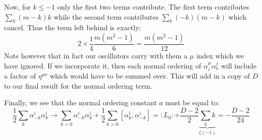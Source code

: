 \documentclass[11pt, class=article, crop=false]{standalone}
\begin{document}
\begin{enumerate}
	 Now, for $k \leq -1$ only the first two terms contribute. The first term contributes $\sum_k (m-k) k$ while the second term contributes $\sum_k (-k) (m-k)$ which cancel. Thus the term left behind is exactly:
	 \begin{equation}
	 	2 \times \frac14 \frac{m(m^2 - 1)}{6} = \frac{m(m^2 - 1)}{12}
	 \end{equation}
	 Note however that in fact our oscillators carry with them a $\mu$ index which we have ignored. If we incorporate it, then each normal ordering of $\alpha_i^\mu \alpha^j_\nu$ will include a factor of $\eta^{\mu \nu}$ which would have to be summed over. This will add in a copy of $D$ to our final result for the normal ordering term.
	 
	 Finally, we see that the normal ordering constant $a$ must be equal to:
	 \begin{equation}
	 	\frac12 \sum_{k} \alpha_{-k}^i \alpha^i_k \to \sum_{k=0} \alpha_{-k}^i \alpha^i_{k} + \frac12 \sum_{k>0} [\alpha^i_{k}, \alpha^i_{-k}] = :L_0: + \frac{D-2}{2} \underbrace{\sum_k k}_{\zeta(-1)} = -\frac{D-2}{24}
	 \end{equation}


\end{enumerate}
\end{document}
